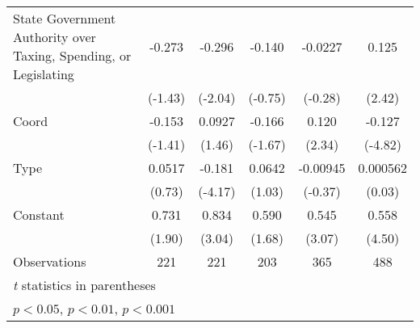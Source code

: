 {\begin{tabular*}{\linewidth}{@{\hskip\tabcolsep\extracolsep\fill}l*{5}{c}}
\addlinespace
State Government Authority over Taxing, Spending, or Legislating&   -0.273         &   -0.296\sym{*}  &   -0.140         &  -0.0227         &    0.125\sym{*}  \\
                &  (-1.43)         &  (-2.04)         &  (-0.75)         &  (-0.28)         &   (2.42)         \\
\addlinespace
Coord           &   -0.153         &   0.0927         &   -0.166         &    0.120\sym{*}  &   -0.127\sym{***}\\
                &  (-1.41)         &   (1.46)         &  (-1.67)         &   (2.34)         &  (-4.82)         \\
\addlinespace
Type            &   0.0517         &   -0.181\sym{***}&   0.0642         & -0.00945         & 0.000562         \\
                &   (0.73)         &  (-4.17)         &   (1.03)         &  (-0.37)         &   (0.03)         \\
\addlinespace
Constant        &    0.731         &    0.834\sym{**} &    0.590         &    0.545\sym{**} &    0.558\sym{***}\\
                &   (1.90)         &   (3.04)         &   (1.68)         &   (3.07)         &   (4.50)         \\
\midrule
Observations    &      221         &      221         &      203         &      365         &      488         \\
\bottomrule
\multicolumn{6}{l}{\footnotesize \textit{t} statistics in parentheses}\\
\multicolumn{6}{l}{\footnotesize \sym{*} \(p<0.05\), \sym{**} \(p<0.01\), \sym{***} \(p<0.001\)}\\
\end{tabular*}
}
